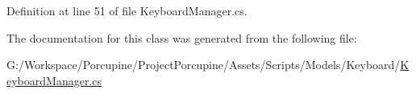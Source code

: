 Definition at line 51 of file Keyboard\+Manager.\+cs.



The documentation for this class was generated from the following file\+:\begin{DoxyCompactItemize}
\item 
G\+:/\+Workspace/\+Porcupine/\+Project\+Porcupine/\+Assets/\+Scripts/\+Models/\+Keyboard/\hyperlink{_keyboard_manager_8cs}{Keyboard\+Manager.\+cs}\end{DoxyCompactItemize}
